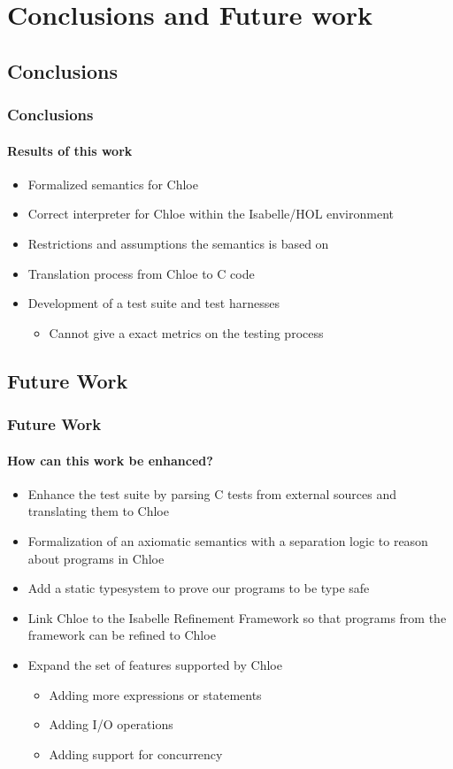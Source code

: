 \section{Conclusions and Future work}


\subsection{Conclusions}


\begin{frame}
\frametitle{Conclusions}
\framesubtitle{Results of this work}

\begin{itemize}
\item{Formalized semantics for Chloe}
\item{Correct interpreter for Chloe within the Isabelle/HOL environment}
\item{Restrictions and assumptions the semantics is based on}
\item{Translation process from Chloe to C code}
\item{Development of a test suite and test harnesses}
\begin{itemize}
\item{Cannot give a exact metrics on the testing process}
\end{itemize}
\end{itemize}

\end{frame}


\subsection{Future Work}


\begin{frame}
\frametitle{Future Work}
\framesubtitle{How can this work be enhanced?}

\begin{itemize}
\item{Enhance the test suite by parsing C tests from external sources and translating them to Chloe}
\item{Formalization of an axiomatic semantics with a separation logic to reason about programs in Chloe}
\item{Add a static typesystem to prove our programs to be type safe}
\item{Link Chloe to the Isabelle Refinement Framework so that programs from the framework can be refined to Chloe}
\item{Expand the set of features supported by Chloe}
\begin{itemize}
\item{Adding more expressions or statements}
\item{Adding I/O operations}
\item{Adding support for concurrency}
\end{itemize}
\end{itemize}


\end{frame}
